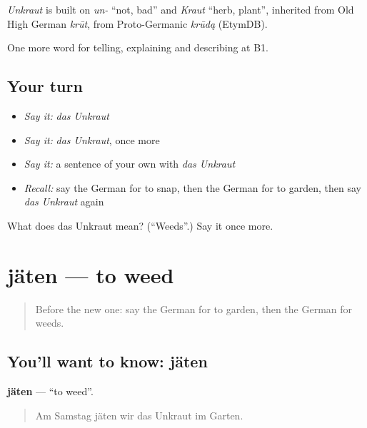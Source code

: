 \begin{cousinweb}
\emph{Unkraut} is built on \emph{un-} \textquotedblleft{}not, bad\textquotedblright{} and \emph{Kraut} \textquotedblleft{}herb, plant\textquotedblright{}, inherited from Old High German \emph{krūt}, from Proto-Germanic \emph{krūdą} (EtymDB).
\end{cousinweb}

\begin{grammarlens}[title={What you've built}]
One more word for telling, explaining and describing at B1.
\end{grammarlens}

\subsection*{Your turn}
\begin{itemize}
\raggedright
  \item \emph{Say it:} \emph{das Unkraut}
  \item \emph{Say it:} \emph{das Unkraut}, once more
  \item \emph{Say it:} a sentence of your own with \emph{das Unkraut}
  \item \emph{Recall:} say the German for to snap, then the German for to garden, then say \emph{das Unkraut} again
\end{itemize}

\begin{tcolorbox}[breakable,colback=teal!4,colframe=teal!35!black,title={Before you move on}]
What does das Unkraut mean? (\textquotedblleft{}Weeds\textquotedblright{}.) Say it once more.
\end{tcolorbox}
\section[jäten]{jäten — to weed}

\label{lesson:GE-C503-jaeten}



\begin{quote}
Before the new one: say the German for to garden, then the German for weeds.
\end{quote}

\subsection*{You'll want to know: jäten}
\textbf{jäten} — \textquotedblleft{}to weed\textquotedblright{}.

\begin{quote}
Am Samstag jäten wir das Unkraut im Garten.
\end{quote}


